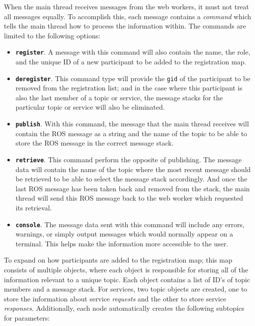     When the main thread receives messages from the web workers, it must not treat all messages equally. To accomplish this, each message contains a \textit{command} which tells the main thread how to process the information within. The commands are limited to the following options:

    \begin{itemize}
        \item \textbf{\texttt{register}}. A message with this command will also contain the name, the role, and the unique ID of a new participant to be added to the registration map.  
        \item \textbf{\texttt{deregister}}. This command type will provide the \texttt{gid} of the participant to be removed from the registration list; and in the case where this participant is also the last member of a topic or service, the message stacks for the particular topic or service will also be eliminated.
        \item \textbf{\texttt{publish}}. With this command, the message that the main thread receives will contain the \ac{ROS} message as a string and the name of the topic to be able to store the \ac{ROS} message in the correct message stack.
        \item \textbf{\texttt{retrieve}}. This command perform the opposite of publishing. The message data will contain the name of the topic where the most recent message should be retrieved to be able to select the message stack accordingly. And once the last \ac{ROS} message has been taken back and removed from the stack, the main thread will send this \ac{ROS} message back to the web worker which requested its retrieval.
        \item \textbf{\texttt{console}}. The message data sent with this command will include any errors, warnings, or simply output messages which would normally appear on a terminal. This helps make the information more accessible to the user.
    \end{itemize}

    To expand on how participants are added to the registration map; this map consists of multiple objects, where each object is responsible for storing all of the information relevant to a unique topic. Each object contains a list of ID's of topic members and a message stack. For services, two topic objects are created, one to store the information about service \textit{requests} and the other to store service \textit{responses}. Additionally, each node automatically creates the following subtopics for parameters:

